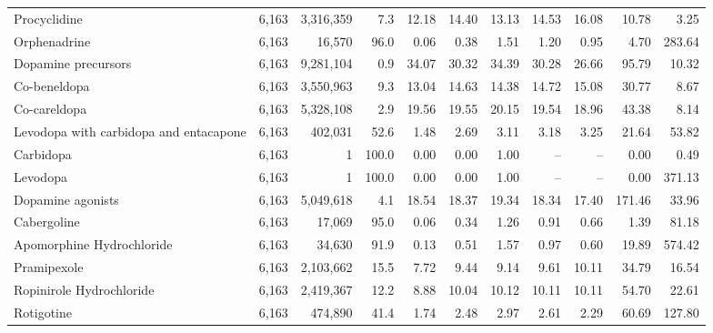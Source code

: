 \begin{table}[htbp]
\begin{adjustbox}{max width=\textwidth}
\begin{tabular}{lrrrrrrrrrr}
\hspace{2em}Procyclidine & 6,163 & 3,316,359 & 7.3 & 12.18 & 14.40 & 13.13 & 14.53 & 16.08 & 10.78 & 3.25 \\
\hspace{2em}Orphenadrine & 6,163 & 16,570 & 96.0 & 0.06 & 0.38 & 1.51 & 1.20 & 0.95 & 4.70 & 283.64 \\
\hspace{1em}Dopamine precursors & 6,163 & 9,281,104 & 0.9 & 34.07 & 30.32 & 34.39 & 30.28 & 26.66 & 95.79 & 10.32 \\
\hspace{2em}Co-beneldopa & 6,163 & 3,550,963 & 9.3 & 13.04 & 14.63 & 14.38 & 14.72 & 15.08 & 30.77 & 8.67 \\
\hspace{2em}Co-careldopa & 6,163 & 5,328,108 & 2.9 & 19.56 & 19.55 & 20.15 & 19.54 & 18.96 & 43.38 & 8.14 \\
\hspace{2em}Levodopa with carbidopa and entacapone & 6,163 & 402,031 & 52.6 & 1.48 & 2.69 & 3.11 & 3.18 & 3.25 & 21.64 & 53.82 \\
\hspace{2em}Carbidopa & 6,163 & 1 & 100.0 & 0.00 & 0.00 & 1.00 & -- & -- & 0.00 & 0.49 \\
\hspace{2em}Levodopa & 6,163 & 1 & 100.0 & 0.00 & 0.00 & 1.00 & -- & -- & 0.00 & 371.13 \\
\hspace{1em}Dopamine agonists & 6,163 & 5,049,618 & 4.1 & 18.54 & 18.37 & 19.34 & 18.34 & 17.40 & 171.46 & 33.96 \\
\hspace{2em}Cabergoline & 6,163 & 17,069 & 95.0 & 0.06 & 0.34 & 1.26 & 0.91 & 0.66 & 1.39 & 81.18 \\
\hspace{2em}Apomorphine Hydrochloride & 6,163 & 34,630 & 91.9 & 0.13 & 0.51 & 1.57 & 0.97 & 0.60 & 19.89 & 574.42 \\
\hspace{2em}Pramipexole & 6,163 & 2,103,662 & 15.5 & 7.72 & 9.44 & 9.14 & 9.61 & 10.11 & 34.79 & 16.54 \\
\hspace{2em}Ropinirole Hydrochloride & 6,163 & 2,419,367 & 12.2 & 8.88 & 10.04 & 10.12 & 10.11 & 10.11 & 54.70 & 22.61 \\
\hspace{2em}Rotigotine & 6,163 & 474,890 & 41.4 & 1.74 & 2.48 & 2.97 & 2.61 & 2.29 & 60.69 & 127.80 \\

\end{tabular}
\end{adjustbox}
\end{table}

